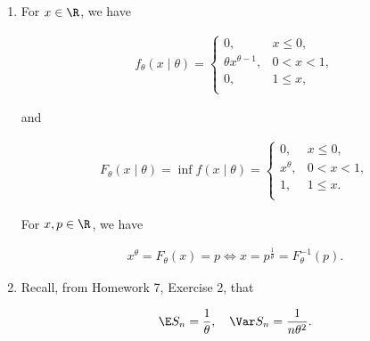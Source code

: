 \begin{solution}

\phantom{}

\begin{enumerate}[label = (\alph*)]

    \item For $x \in \R$, we have

    \begin{align*}
        f_\theta(x \mid \theta)
        =
        \begin{cases}
            0,                     & x \leq 0,  \\
            \theta x^{\theta - 1}, & 0 < x < 1, \\
            0,                     & 1 \leq x,  \\
        \end{cases}
    \end{align*}

    and

    \begin{align*}
        F_\theta(x \mid \theta)
        =
        \inf f(x \mid \theta)
        =
        \begin{cases}
            0,        & x \leq 0,  \\
            x^\theta, & 0 < x < 1, \\
            1,        & 1 \leq  x.   \\
        \end{cases}
    \end{align*}
    
    For $x, p \in \R$, we have

    \begin{align*}
        x^\theta = F_\theta(x) = p
        \iff
        x = p^\frac{1}{\theta} = F_\theta^{-1}(p).
    \end{align*}

    \item Recall, from Homework 7, Exercise 2, that
    
    \begin{align*}
        \E S_n = \frac{1}{\theta},
        \quad
        \Var S_n = \frac{1}{n \theta^2}.
    \end{align*}

\end{enumerate}



\end{solution}

